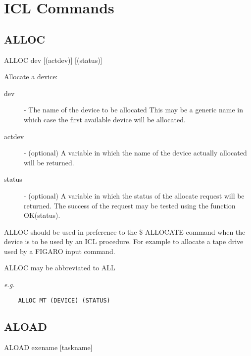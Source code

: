 \documentclass[twoside,11pt]{report}
\newcommand{\xlabel}[1]{}
\begin{document}
\chapter{\xlabel{icl_commands}ICL Commands}

\section{\xlabel{alloc}ALLOC}



    ALLOC \hspace{.5cm} dev \hspace{.5cm} [(actdev)] \hspace{.5cm} [(status)]

    Allocate a device:
\begin{description}

\item[dev] - The name of the device to be allocated
            This may be a generic name in which case the first
            available device will be allocated.

\item[actdev] - (optional) A variable in which the name of the
            device actually allocated will be returned.

\item[status] - (optional) A variable in which the status of
            the allocate request will be returned. The success of
            the request may be tested using the function OK(status).

\end{description}

  ALLOC should be used in preference to the \$ ALLOCATE command when
  the device is to be used by an ICL procedure. For example to allocate
  a tape drive used by a FIGARO input command.

  ALLOC may be abbreviated to ALL

{\em e.g. }
\begin{verbatim}
    ALLOC MT (DEVICE) (STATUS) 
\end{verbatim}   

\section{\xlabel{ALOAD}ALOAD\label{ALOAD}}

 
    ALOAD \hspace{.5cm} exename \hspace{.5cm} [taskname]
\end{document}
